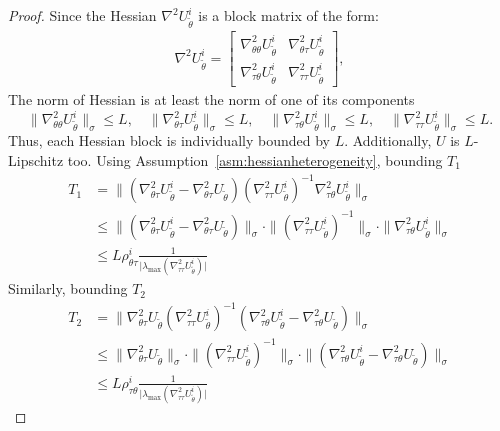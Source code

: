 \documentclass{article}
\theoremstyle{definition}
\begin{document}
\begin{proof}
Since the Hessian \( \nabla^2 U_{\tilde\theta}^i \) is a block matrix of the form:
\begin{align*} 
    \nabla^2 U_{\tilde\theta}^i =
\begin{bmatrix}
\nabla_{\theta\theta}^2 U_{\tilde\theta}^i & \nabla_{\theta\tau}^2 U_{\tilde\theta}^i \\
\nabla_{\tau\theta}^2 U_{\tilde\theta}^i & \nabla_{\tau\tau}^2 U_{\tilde\theta}^i
\end{bmatrix},
\end{align*}
The norm of Hessian is at least the norm of one of its components
\begin{equation*}
\|\nabla_{\theta\theta}^2 U_{\tilde\theta}^i\|_{\sigma} \leq L, \quad
\|\nabla_{\theta\tau}^2 U_{\tilde\theta}^i\|_{\sigma} \leq L, \quad
\|\nabla_{\tau\theta}^2 U_{\tilde\theta}^i\|_{\sigma} \leq L, \quad
\|\nabla_{\tau\tau}^2 U_{\tilde\theta}^i\|_{\sigma} \leq L.
\end{equation*}
\noindent Thus, each Hessian block is individually bounded by $L$.
Additionally, $U$ is $L$-Lipschitz too.
\noindent Using Assumption~\ref{asm:hessianheterogeneity}, bounding $T_1$
\begin{align*}
    T_1&=\|(\nabla_{\theta\tau}^2 U_{\tilde\theta}^i - \nabla_{\theta\tau}^2 U_{\tilde\theta}) (\nabla_{\tau\tau}^2 U_{\tilde\theta}^i)^{-1} \nabla_{\tau\theta}^2 U_{\tilde\theta}^i\|_{\sigma}\\
    &\leq \|(\nabla_{\theta\tau}^2 U_{\tilde\theta}^i - \nabla_{\theta\tau}^2 U_{\tilde\theta}) \|_{\sigma}\cdot\|(\nabla_{\tau\tau}^2 U_{\tilde\theta}^i)^{-1}\|_{\sigma}\cdot\|\nabla_{\tau\theta}^2 U_{\tilde\theta}^i\|_{\sigma}\\
    &\leq L\rho_{\theta\tau}^i\frac{1}{\vert\lambda_{\max}(\nabla_{\tau\tau}^2 U_{\tilde\theta}^i)\vert}
\end{align*}
Similarly, bounding $T_2$
\begin{align*}
    T_2&=\|\nabla_{\theta\tau}^2 U_{\tilde\theta} (\nabla_{\tau\tau}^2 U_{\tilde\theta}^i)^{-1} (\nabla_{\tau\theta}^2 U_{\tilde\theta}^i - \nabla_{\tau\theta}^2 U_{\tilde\theta})\|_{\sigma}\\
    &\leq \|\nabla_{\theta\tau}^2 U_{\tilde\theta}\|_{\sigma}\cdot \|(\nabla_{\tau\tau}^2 U_{\tilde\theta}^i)^{-1}\|_{\sigma}\cdot\|(\nabla_{\tau\theta}^2 U_{\tilde\theta}^i - \nabla_{\tau\theta}^2 U_{\tilde\theta})\|_{\sigma}\\
    &\leq L\rho_{\tau\theta}^i\frac{1}{\vert\lambda_{\max}(\nabla_{\tau\tau}^2 U_{\tilde\theta}^i)\vert}
\end{align*}

\end{proof}
\end{document}
